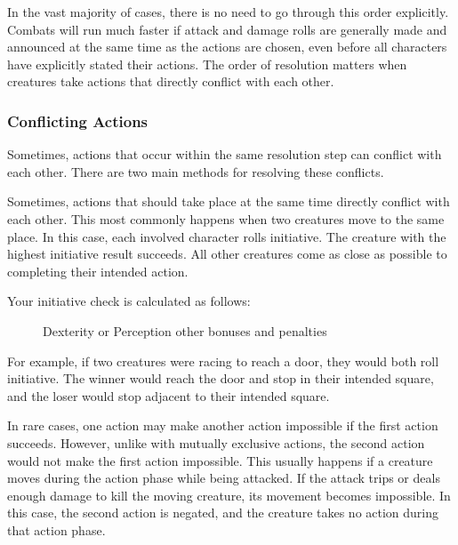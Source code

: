         In the vast majority of cases, there is no need to go through this order explicitly.
        Combats will run much faster if attack and damage rolls are generally made and announced at the same time as the actions are chosen, even before all characters have explicitly stated their actions.
        The order of resolution matters when creatures take actions that directly conflict with each other.

        \subsubsection{Conflicting Actions}\label{Conflicting Actions}

            Sometimes, actions that occur within the same resolution step can conflict with each other.
            There are two main methods for resolving these conflicts.

             Sometimes, actions that should take place at the same time directly conflict with each other.
            This most commonly happens when two creatures move to the same place.
            In this case, each involved character rolls initiative.
            The creature with the highest initiative result succeeds.
            All other creatures come as close as possible to completing their intended action.

            Your initiative check is calculated as follows:

            \begin{figure}[h]
                \centering Dexterity or Perception \add other bonuses and penalties
            \end{figure}

            For example, if two creatures were racing to reach a door, they would both roll initiative.
            The winner would reach the door and stop in their intended square, and the loser would stop adjacent to their intended square.

             In rare cases, one action may make another action impossible if the first action succeeds.
            However, unlike with mutually exclusive actions, the second action would not make the first action impossible.
            This usually happens if a creature moves during the action phase while being attacked.
            If the attack trips or deals enough damage to kill the moving creature, its movement becomes impossible.
            In this case, the second action is negated, and the creature takes no action during that action phase.

